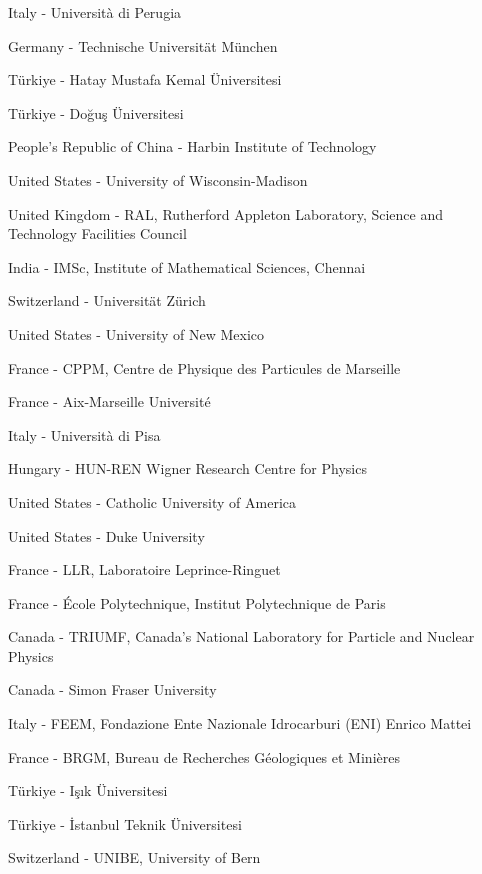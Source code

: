 \item[$^{73}$] Italy - Universit{\`a} di Perugia
\item[$^{74}$] Germany - Technische Universit{\"a}t M{\"u}nchen
\item[$^{75}$] T{\"u}rkiye - Hatay Mustafa Kemal {\"U}niversitesi
\item[$^{76}$] T{\"u}rkiye - Do{\u g}u{\c s} {\"U}niversitesi
\item[$^{77}$] People's Republic of China - Harbin Institute of Technology
\item[$^{78}$] United States - University of Wisconsin-Madison
\item[$^{79}$] United Kingdom - RAL, Rutherford Appleton Laboratory, Science and Technology Facilities Council
\item[$^{80}$] India - IMSc, Institute of Mathematical Sciences, Chennai
\item[$^{81}$] Switzerland - Universit{\"a}t Z{\"u}rich 
\item[$^{82}$] United States - University of New Mexico
\item[$^{83}$] France - CPPM, Centre de Physique des Particules de Marseille
\item[$^{84}$] France - Aix-Marseille Universit{\'e}
\item[$^{85}$] Italy - Universit{\`a} di Pisa
\item[$^{86}$] Hungary - HUN-REN Wigner Research Centre for Physics
\item[$^{87}$] United States - Catholic University of America
\item[$^{88}$] United States - Duke University
\item[$^{89}$] France - LLR, Laboratoire Leprince-Ringuet
\item[$^{90}$] France - {\'E}cole Polytechnique, Institut Polytechnique de Paris
\item[$^{91}$] Canada - TRIUMF, Canada's National Laboratory for Particle and Nuclear Physics
\item[$^{92}$] Canada - Simon Fraser University
\item[$^{93}$] Italy - FEEM, Fondazione Ente Nazionale Idrocarburi (ENI) Enrico Mattei
\item[$^{94}$] France - BRGM, Bureau de Recherches G{\'e}ologiques et Mini{\`e}res
\item[$^{95}$] T{\"u}rkiye - I{\c s}{\i}k {\"U}niversitesi
\item[$^{96}$] T{\"u}rkiye - {\.{I}}stanbul Teknik {\"U}niversitesi
\item[$^{97}$] Switzerland - UNIBE, University of Bern
